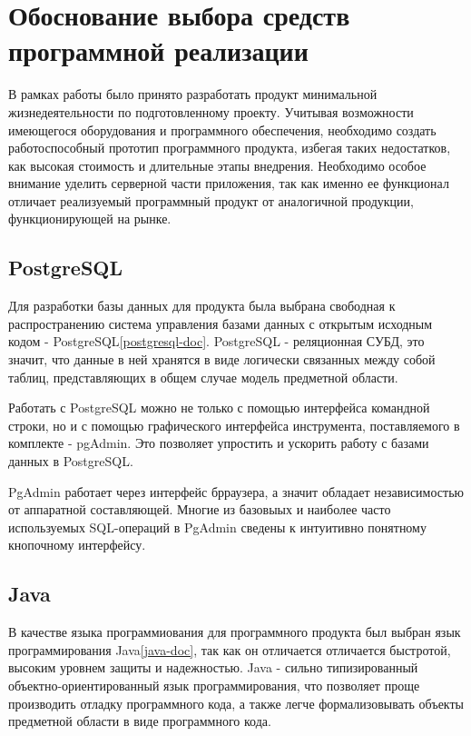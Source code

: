 \section{Обоснование выбора средств программной реализации}

В рамках работы было принято разработать продукт минимальной жизнедеятельности по подготовленному проекту. 
Учитывая возможности имеющегося оборудования и программного обеспечения, необходимо создать работоспособный прототип программного продукта, избегая таких недостатков, как высокая стоимость и длительные этапы внедрения.
Необходимо особое внимание уделить серверной части приложения, так как именно ее функционал отличает реализуемый программный продукт от аналогичной продукции, функционирующей на рынке.

\subsection{PostgreSQL}

Для разработки базы данных для продукта была выбрана свободная к распространению система управления базами данных с открытым исходным кодом - PostgreSQL\ref{postgresql-doc}.
PostgreSQL - реляционная СУБД, это значит, что данные в ней хранятся в виде логически связанных между собой таблиц, представляющих в общем случае модель предметной области.

Работать с PostgreSQL можно не только с помощью интерфейса командной строки, но и с помощью графического интерфейса инструмента, поставляемого в комплекте - pgAdmin. 
Это позволяет упростить и ускорить работу с базами данных в PostgreSQL.

PgAdmin работает через интерфейс брраузера, а значит обладает независимостью от аппаратной составляющей.
Многие из базовыых и наиболее часто используемых SQL-операций в PgAdmin сведены к интуитивно понятному кнопочному интерфейсу.

\subsection{Java}

В качестве языка программиования для программного продукта был выбран язык программирования Java\ref{java-doc}, так как он отличается отличается быстротой, высоким уровнем защиты и надежностью.
Java - сильно типизированный объектно-ориентированный язык программирования, что позволяет проще производить отладку программного кода, а также легче формализовывать объекты предметной области в виде программного кода.

